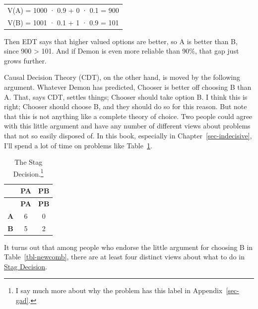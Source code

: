 \documentclass[
  12pt,
  letterpaper,
  DIV=11,
  numbers=noendperiod]{scrreprt}
\begin{document}
\begin{longtable}[]{@{}c@{}}
\toprule\noalign{}
\endhead
\bottomrule\noalign{}
\endlastfoot
V(A) = 1000 · 0.9 + 0 · 0.1 = 900 \\
V(B) = 1001 · 0.1 + 1 · 0.9 = 101 \\
\end{longtable}

Then EDT says that higher valued options are better, so A is better than
B, since 900 \textgreater{} 101. And if Demon is even more reliable than
90\%, that gap just grows further.

Causal Decision Theory (CDT), on the other hand, is moved by the
following argument. Whatever Demon has predicted, Chooser is better off
choosing B than A. That, says CDT, settles things; Chooser should take
option B. I think this is right; Chooser should choose B, and they
should do so for this reason. But note that this is not anything like a
complete theory of choice. Two people could agree with this little
argument and have any number of different views about problems that not
so easily disposed of. In this book, especially in
Chapter~\ref{sec-indecisive}, I'll spend a lot of time on problems like
Table~\ref{tbl-stag-decision-first}.

\begin{longtable}[]{@{}ccc@{}}
\caption[The Stag Decision.]{The Stag
Decision.\footnote{I say much more about why the problem has this label
  in Appendix~\ref{sec-gad}.}}\label{tbl-stag-decision-first}\tabularnewline
\toprule\noalign{}
& \textbf{PA} & \textbf{PB} \\
\midrule\noalign{}
\endfirsthead
\toprule\noalign{}
& \textbf{PA} & \textbf{PB} \\
\midrule\noalign{}
\endhead
\bottomrule\noalign{}
\endlastfoot
\textbf{A} & 6 & 0 \\
\textbf{B} & 5 & 2 \\
\end{longtable}

It turns out that among people who endorse the little argument for
choosing B in Table~\ref{tbl-newcomb}, there are at least four distinct
views about what to do in \hyperref[tbl-stag-decision-first]{Stag
Decision}.
\end{document}
